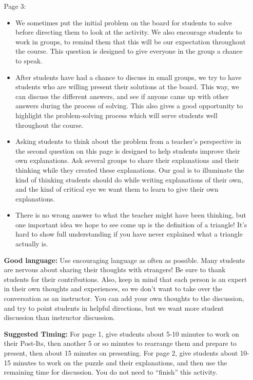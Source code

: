 \documentclass {ximera}
\begin{document}
\begin{instructorNotes}
Page 3:
\begin{itemize}


\item We sometimes put the initial problem on the board for students to solve before directing them to look at the activity.  We also encourage students to work in groups, to remind them that this will be our expectation throughout the course.  This question is designed to give everyone in the group a chance to speak.

\item After students have had a chance to discuss in small groups, we try to have students who are willing present their solutions at the board.  This way, we can discuss the different answers, and see if anyone came up with other answers during the process of solving.  This also gives a good opportunity to highlight the problem-solving process which will serve students well throughout the course.

\item Asking students to think about the problem from a teacher's perspective in the second question on this page is designed to help students improve their own explanations. Ask several groups to share their explanations and their thinking while they created these explanations. Our goal is to illuminate the kind of thinking students should do while writing explanations of their own, and the kind of critical eye we want them to learn to give their own explanations.

\item There is no wrong answer to what the teacher might have been thinking, but one important idea we hope to see come up is the definition of a triangle! It's hard to show full understanding if you have never explained what a triangle actually is.
\end{itemize}


{\bf Good language:}                                                                                                                                                   
Use encouraging language as often as possible. Many students are nervous about sharing their thoughts with strangers! Be sure to thank students for their contributions. Also, keep in mind that each person is an expert in their own thoughts and experiences, so we don't want to take over the conversation as an instructor. You can add your own thoughts to the discussion, and try to point students in helpful directions, but we want more student discussion than instructor discussion.






{\bf Suggested Timing:} For page 1, give students about 5-10 minutes to work on their Post-Its, then another 5 or so minutes to rearrange them and prepare to present, then about 15 minutes on presenting. For page 2, give students about 10-15 minutes to work on the puzzle and their explanations, and then use the remaining time for discussion. You do not need to ``finish'' this activity.


\end{instructorNotes}
\end{document}
